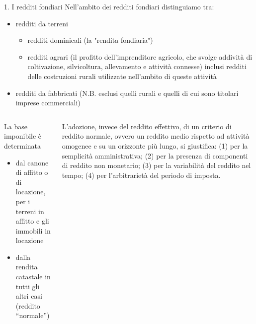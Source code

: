 \documentclass[aspectratio=64,12pt]{beamer}
\newcommand\€{\,\text{€}}
\begin{document}
\begin{frame}{1. I redditi fondiari}
Nell'ambito dei redditi fondiari distinguiamo tra:
\begin{itemize}
\item \alert{redditi da terreni}
\begin{itemize}
\item redditi \alert{dominicali} (la "rendita fondiaria")
\item redditi \alert{agrari} (il profitto dell'imprenditore agricolo, che svolge
addività di coltivazione, silvicoltura, allevamento e attività connesse)
inclusi redditi delle costruzioni rurali utilizzate nell'ambito di queste
attività
\end{itemize}
\item \alert{redditi da fabbricati} (N.B. esclusi quelli rurali e quelli di cui sono titolari
imprese commerciali)
\end{itemize}

\begin{columns}
  \begin{column}{.5\textwidth}
La base imponibile è determinata
\begin{itemize}
\item dal \alert{canone di affitto o di locazione}, per i terreni in affitto e gli immobili
in locazione
\item dalla \alert{rendita catastale} in tutti gli altri casi (reddito ``normale'')
\end{itemize}
\end{column}
\begin{column}{.5\textwidth}
\begin{block}{}
\small
L'adozione, invece del reddito effettivo, di un criterio di \alert{reddito
normale}, ovvero un reddito medio rispetto ad attività omogenee e su un
orizzonte più lungo, si giustifica: (1) per la semplicità amministrativa; (2) per
la presenza di componenti di reddito non monetario; (3) per la variabilità del
reddito nel tempo; (4) per l'arbitrarietà del periodo di imposta.
\end{block}
\end{column}
\end{columns}
\end{frame}
\end{document}
